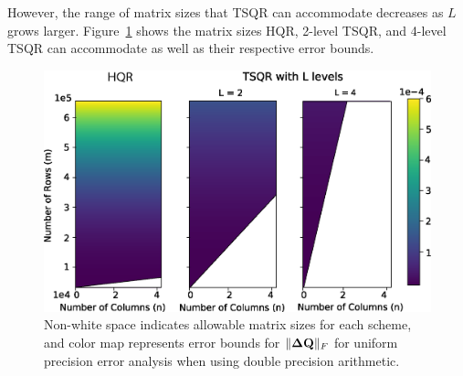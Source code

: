 However, the range of matrix sizes that TSQR can accommodate decreases as $L$ grows larger.
Figure~\ref{fig:paramspace} shows the matrix sizes HQR, 2-level TSQR, and 4-level TSQR can accommodate as well as their respective error bounds.\par
\begin{figure}
	\centering
	\includegraphics[width=.45\textwidth]{./figures/paramspace.png}
	\caption{\label{fig:paramspace} Non-white space indicates allowable matrix sizes for each scheme, and color map represents error bounds for $\|\mathbf{\Delta Q}\|_F$ for uniform precision error analysis when using double precision arithmetic.}
	\vspace{-10pt}	
\end{figure}